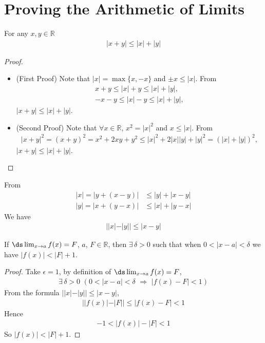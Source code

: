 \section{Proving the Arithmetic of Limits}\label{sec proof arith lim}
\begin{lemma}\label{lem_1_9_1}
For any $x,y \in \mathbb{R}$
\begin{align*}
|x+y| \leqslant |x| + |y|
\end{align*}
\end{lemma}
\begin{proof}
\begin{itemize}
\item (First Proof) Note that $|x| = \max\{x, -x\}$ and $\pm x\leqslant |x|$. From
\begin{align*}
x + y \leqslant |x| + y \leqslant |x| + |y|, \\
-x - y \leqslant |x| - y \leqslant |x| + |y|,
\end{align*}
$|x + y|\leqslant |x| + |y|$.
\item (Second Proof) Note that $\forall x\in\mathbb{R}$, $x^2 = |x|^2$ and $x \leqslant |x|$. From
\begin{align*}
|x + y|^2 = (x + y)^2 = x^2 + 2 x y + y^2 \leqslant |x|^2 + 2 |x||y| + |y|^2 = (|x| + |y|)^2,
\end{align*}
$|x + y|\leqslant |x| + |y|$.
\end{itemize}
\end{proof}
From
\begin{align*}
|x| = |y + (x - y)| &\leqslant |y| + |x - y| \\
|y| = |x + (y - x)| &\leqslant |x| + |y - x|
\end{align*}
We have
\begin{align*}
||x| - |y|| \leqslant |x - y|
\end{align*}
\begin{lemma}\label{lem fx F1}
If $\ds \lim_{x \to a} f(x) = F$, $a$, $F\in\mathbb{R}$, then $\exists\,\delta >0$ such that when $0<|x-a|<\delta$ we have $|f(x)| < |F| + 1$.
\end{lemma}
\begin{proof}
Take $\epsilon = 1$, by definition of $\ds \lim_{x \to a} f(x) = F$,
\begin{align*}
\exists\,\delta > 0\,\,(0 < |x - a| < \delta\,\,\Longrightarrow\,\, |f(x) - F| < 1)
\end{align*}
From the formula $||x| - |y|| \leqslant |x - y|$,
\begin{align*}
||f(x)| - |F|| \leqslant |f(x) - F| < 1
\end{align*}
Hence
\begin{align*}
-1 < |f(x)| - |F| < 1
\end{align*}
So $|f(x)| < |F| + 1$.
\end{proof}
